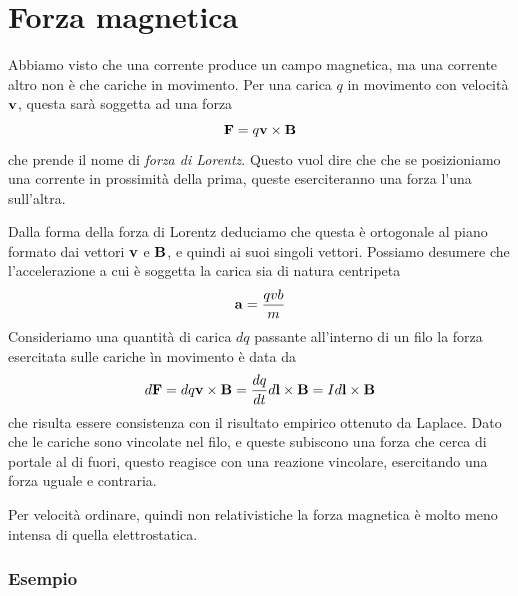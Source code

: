 \section{Forza magnetica}

Abbiamo visto che una corrente produce un campo magnetica, ma una corrente altro non \`e che cariche in movimento. Per una carica $q$ in movimento con velocit\`a $\bold{v}$, questa sar\`a soggetta ad una forza 
\begin{equation*}
	\bold{F} = q\bold{v} \times \bold{B}
\end{equation*}
che prende il nome di \textit{forza di Lorentz}. Questo vuol dire che che se posizioniamo una corrente in prossimit\`a della prima, queste eserciteranno una forza l'una sull'altra.

Dalla forma della forza di Lorentz deduciamo che questa  \`e ortogonale al piano formato dai vettori $\bold{v}$ e $\bold{B}$, e quindi ai suoi singoli vettori. Possiamo desumere che l'accelerazione a cui \`e soggetta la carica sia di natura centripeta 
\begin{equation*}
	\bold{a} = \frac{qvb}{m}
\end{equation*}
Consideriamo una quantit\`a di carica $dq$ passante all'interno di un filo la forza esercitata sulle cariche \`in movimento \`e data da 
\begin{equation*}
	d\bold{F} = dq\bold{v} \times \bold{B} = \frac{dq}{dt}d\bold{l} \times \bold{B} = Id \bold{l} \times \bold{B}
\end{equation*}
che risulta essere consistenza con il risultato empirico ottenuto da Laplace. Dato che le cariche sono vincolate nel filo, e queste subiscono una forza che cerca di portale al di fuori, questo reagisce con una reazione vincolare, esercitando una forza uguale e contraria.

Per velocit\`a ordinare, quindi non relativistiche la forza magnetica \`e molto meno intensa di quella elettrostatica.

\subsubsection{Esempio}


